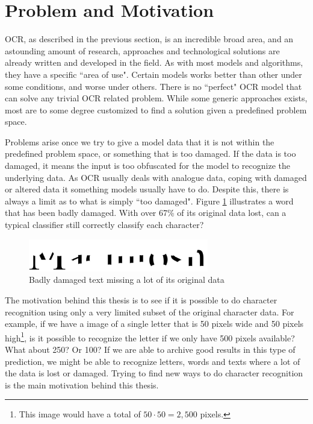 
\section{Problem and Motivation}
\label{sec:problem_motivation}
OCR, as described in the previous section, is an incredible broad area, and an astounding amount of research, approaches and technological solutions are already written and developed in the field. As with most models and algorithms, they have a specific ``area of use". Certain models works better than other under some conditions, and worse under others. There is no ``perfect" OCR model that can solve any trivial OCR related problem. While some generic approaches exists, most are to some degree customized to find a solution given a predefined problem space.

Problems arise once we try to give a model data that it is not within the predefined problem space, or something that is too damaged. If the data is too damaged, it means the input is too obfuscated for the model to recognize the underlying data. As OCR usually deals with analogue data, coping with damaged or altered data it something models usually have to do. Despite this, there is always a limit as to what is simply ``too damaged". Figure \ref{fig:damaged-text} illustrates a word that has been badly damaged. With over 67\% of its original data lost, can a typical classifier still correctly classify each character?

\begin{figure}[ht]
    \centering
    \includegraphics[width=0.7\textwidth]{fig/chapter1/damaged.png}
    \caption{Badly damaged text missing a lot of its original data}
    \label{fig:damaged-text}
\end{figure}

The motivation behind this thesis is to see if it is possible to do character recognition using only a very limited subset of the original character data. For example, if we have a image of a single letter that is 50 pixels wide and 50 pixels high\footnote{This image would have a total of $50 \cdot 50 = 2,500$ pixels.}, is it possible to recognize the letter if we only have 500 pixels available? What about 250? Or 100? If we are able to archive good results in this type of prediction, we might be able to recognize letters, words and texts where a lot of the data is lost or damaged. Trying to find new ways to do character recognition is the main motivation behind this thesis.

